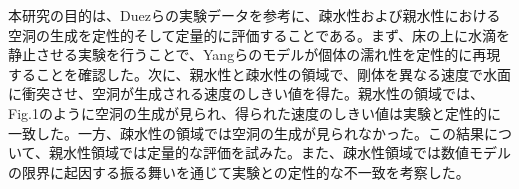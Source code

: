 \documentclass[a4paper]{jsarticle}
\begin{document}
{ 本研究の目的は、Duezらの実験データを参考に、疎水性および親水性における空洞の生成を定性的そして定量的に評価することである。まず、床の上に水滴を静止させる実験を行うことで、Yangらのモデルが個体の濡れ性を定性的に再現することを確認した。次に、親水性と疎水性の領域で、剛体を異なる速度で水面に衝突させ、空洞が生成される速度のしきい値を得た。親水性の領域では、Fig.1のように空洞の生成が見られ、得られた速度のしきい値は実験と定性的に一致した。一方、疎水性の領域では空洞の生成が見られなかった。この結果について、親水性領域では定量的な評価を試みた。また、疎水性領域では数値モデルの限界に起因する振る舞いを通じて実験との定性的な不一致を考察した。





}
\end{document}
